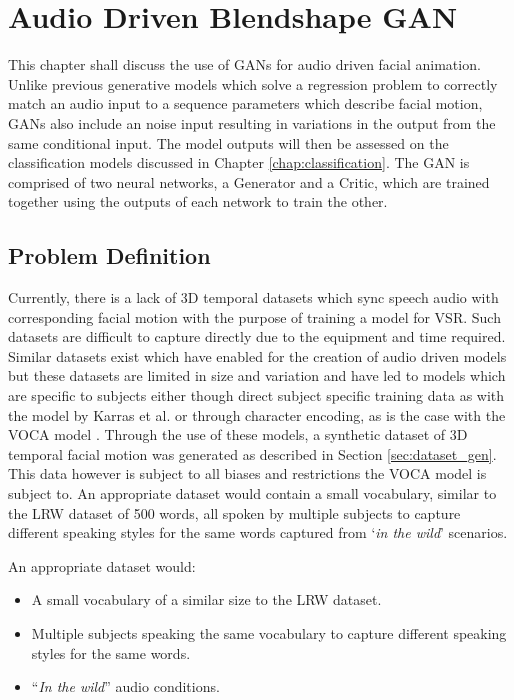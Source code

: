 


\chapter{Audio Driven Blendshape GAN} \label{chap:generation}
This chapter shall discuss the use of GANs for audio driven facial animation.
Unlike previous generative models which solve a regression problem to correctly match an audio input to a sequence parameters which describe facial motion, GANs also include an noise input resulting in variations in the output from the same conditional input.
The model outputs will then be assessed on the classification models discussed in Chapter \ref{chap:classification}.
The GAN is comprised of two neural networks, a Generator and a Critic, which are trained together using the outputs of each network to train the other.

\section{Problem Definition}
Currently, there is a lack of 3D temporal datasets which sync speech audio with corresponding facial motion with the purpose of training a model for VSR.
Such datasets are difficult to capture directly due to the equipment and time required.
Similar datasets exist which have enabled for the creation of audio driven models but these datasets are limited in size and variation and have led to models which are specific to subjects either though direct subject specific training data as with the model by Karras et al. \cite{Karras2017a} or through character encoding, as is the case with the VOCA model \cite{Cudeiro2019}.
Through the use of these models, a synthetic dataset of 3D temporal facial motion was generated as described in Section \ref{sec:dataset_gen}.
This data however is subject to all biases and restrictions the VOCA model is subject to.
An appropriate dataset would contain a small vocabulary, similar to the LRW dataset of 500 words, all spoken by multiple subjects to capture different speaking styles for the same words captured from `\textit{in the wild}' scenarios.

An appropriate dataset would:
\begin{itemize}
    \item A small vocabulary of a similar size to the LRW dataset.
    \item Multiple subjects speaking the same vocabulary to capture different speaking styles for the same words.
    \item ``\textit{In the wild}'' audio conditions.
\end{itemize}

